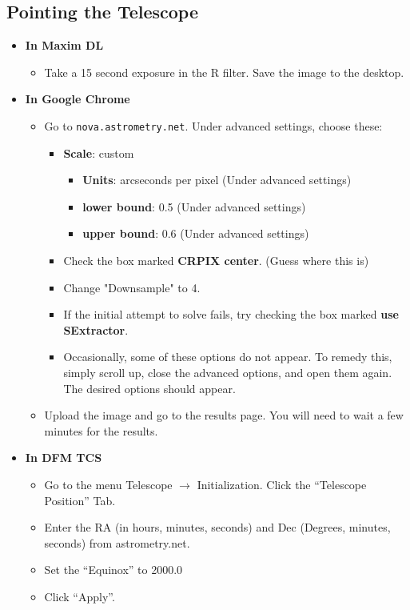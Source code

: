 \documentclass[letterpaper, 12pt]{report}
\begin{document}
\subsection{Pointing the Telescope}
\begin{itemize}
	\item \large \textbf{In Maxim DL}
	\begin{itemize}
		\item Take a 15 second exposure in the R filter. Save the image to the desktop.
	\end{itemize}
	\item \large \textbf{In Google Chrome}
	\begin{itemize}
		\item Go to \texttt{nova.astrometry.net}. Under advanced settings, choose these:
		\begin{itemize}
			\item \textbf{Scale}: custom
			\begin{itemize}
				\item \textbf{Units}: arcseconds per pixel (Under advanced settings)
				\item \textbf{lower bound}: 0.5 (Under advanced settings)
				\item \textbf{upper bound}: 0.6 (Under advanced settings)
			\end{itemize}
			\item Check the box marked \textbf{CRPIX center}. (Guess where this is)
			\item Change "Downsample" to 4.
			\item If the initial attempt to solve fails, try checking the box marked \textbf{use SExtractor}.
			\item Occasionally, some of these options do not appear. To remedy this, simply scroll up, close the advanced options, and open them again. The desired options should appear.
		\end{itemize}
		\item Upload the image and go to the results page. You will need to wait a few minutes for the results.
	\end{itemize}
	\newpage
	\item \large \textbf{In DFM TCS}
	\begin{itemize}
		\item Go to the menu Telescope $\rightarrow$ Initialization. Click the ``Telescope Position'' Tab.
		\item Enter the RA (in hours, minutes, seconds) and Dec (Degrees, minutes, seconds) from astrometry.net.
		\item Set the ``Equinox'' to 2000.0
		\item Click ``Apply''.
	\end{itemize}
\end{itemize}
\end{document}
